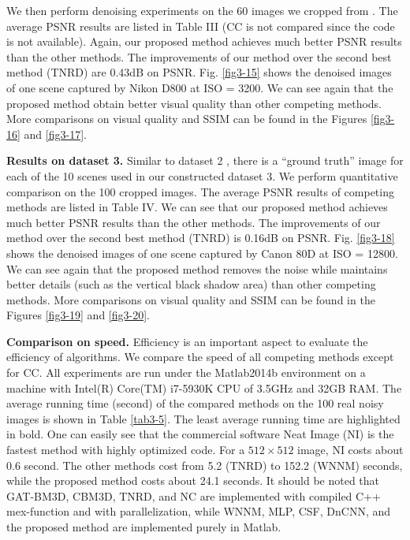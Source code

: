 We then perform denoising experiments on the 60 images we cropped from \cite{crosschannel2016}. The average PSNR results are listed in Table III (CC is not compared since the code is not available). Again, our proposed method achieves much better PSNR results than the other methods. The improvements of our method over the second best method (TNRD) are 0.43dB on PSNR. Fig. \ref{fig3-15} shows the denoised images of one scene captured by Nikon D800 at ISO = 3200. We can see again that the proposed method obtain better visual quality than other competing methods. More comparisons on visual quality and SSIM can be found in the Figures \ref{fig3-16} and \ref{fig3-17}.

\textbf{Results on dataset 3.}
Similar to dataset 2 \cite{crosschannel2016}, there is a ``ground truth'' image for each of the 10 scenes used in our constructed dataset 3. We perform quantitative comparison on the 100 cropped images. The average PSNR results of competing methods are listed in Table IV. We can see that our proposed method achieves much better PSNR results than the other methods. The improvements of our method over the second best method (TNRD) is 0.16dB on PSNR. Fig. \ref{fig3-18} shows the denoised images of one scene captured by Canon 80D at ISO = 12800. We can see again that the proposed method removes the noise while maintains better details (such as the vertical black shadow area) than other competing methods. More comparisons on visual quality and SSIM can be found in the Figures \ref{fig3-19} and \ref{fig3-20}.

\textbf{Comparison on speed.}
Efficiency is an important aspect to evaluate the efficiency of algorithms. We compare the speed of all competing methods except for CC. All experiments are run under the Matlab2014b environment on a machine with Intel(R) Core(TM) i7-5930K CPU of 3.5GHz and 32GB RAM. The average running time (second) of the compared methods on the 100 real noisy images is shown in Table \ref{tab3-5}. The least average running time are highlighted in bold. One can easily see that the commercial software Neat Image (NI) is the fastest method with highly optimized code. For a $512\times512$ image, NI costs about 0.6 second. The other methods cost from 5.2 (TNRD) to 152.2 (WNNM) seconds, while the proposed method costs about 24.1 seconds. It should be noted that GAT-BM3D, CBM3D, TNRD, and NC are implemented with compiled C++ mex-function and with parallelization, while WNNM, MLP, CSF, DnCNN, and the proposed method are implemented purely in Matlab. 

